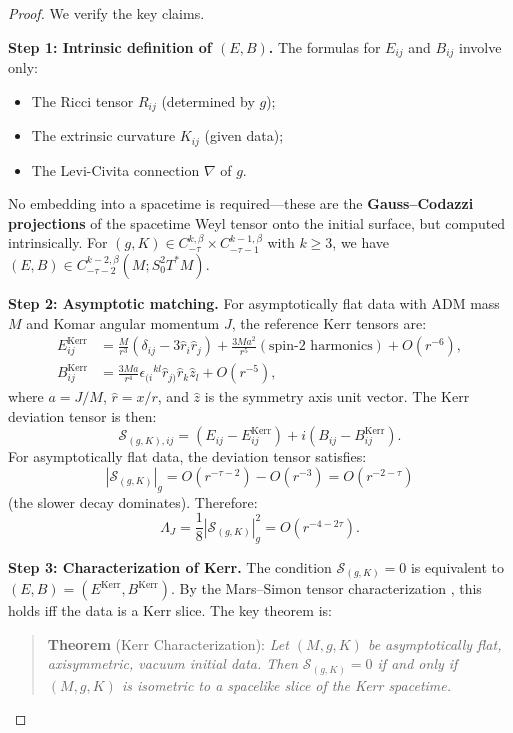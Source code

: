 \documentclass[12pt]{article}
\theoremstyle{plain}
\theoremstyle{definition}
\theoremstyle{remark}
\newcommand{\Hoelder}{\beta}
\begin{document}
\begin{proof}[Proof]
We verify the key claims.

\textbf{Step 1: Intrinsic definition of $(E, B)$.}
The formulas for $E_{ij}$ and $B_{ij}$ involve only:
\begin{itemize}
    \item The Ricci tensor $R_{ij}$ (determined by $g$);
    \item The extrinsic curvature $K_{ij}$ (given data);
    \item The Levi-Civita connection $\nabla$ of $g$.
\end{itemize}
No embedding into a spacetime is required---these are the \textbf{Gauss--Codazzi projections} of the spacetime Weyl tensor onto the initial surface, but computed intrinsically. For $(g, K) \in C^{k,\Hoelder}_{-\tau} \times C^{k-1,\Hoelder}_{-\tau-1}$ with $k \geq 3$, we have $(E, B) \in C^{k-2,\Hoelder}_{-\tau-2}(M; S^2_0 T^*M)$.

\textbf{Step 2: Asymptotic matching.} For asymptotically flat data with ADM mass $M$ and Komar angular momentum $J$, the reference Kerr tensors are:
\begin{align*}
E^{\mathrm{Kerr}}_{ij} &= \frac{M}{r^3}\left(\delta_{ij} - 3\hat{r}_i\hat{r}_j\right) + \frac{3Ma^2}{r^5}\left(\text{spin-2 harmonics}\right) + O(r^{-6}), \\
B^{\mathrm{Kerr}}_{ij} &= \frac{3Ma}{r^4}\epsilon_{(i}{}^{kl}\hat{r}_{j)}\hat{r}_k \hat{z}_l + O(r^{-5}),
\end{align*}
where $a = J/M$, $\hat{r} = x/r$, and $\hat{z}$ is the symmetry axis unit vector. The Kerr deviation tensor is then:
\[
\mathcal{S}_{(g,K),ij} = (E_{ij} - E^{\mathrm{Kerr}}_{ij}) + i(B_{ij} - B^{\mathrm{Kerr}}_{ij}).
\]
For asymptotically flat data, the deviation tensor satisfies:
\[
|\mathcal{S}_{(g,K)}|_g = O(r^{-\tau-2}) - O(r^{-3}) = O(r^{-2-\tau})
\]
(the slower decay dominates). Therefore:
\[
\Lambda_J = \frac{1}{8}|\mathcal{S}_{(g,K)}|^2_g = O(r^{-4-2\tau}).
\]

\textbf{Step 3: Characterization of Kerr.}
The condition $\mathcal{S}_{(g,K)} = 0$ is equivalent to $(E, B) = (E^{\mathrm{Kerr}}, B^{\mathrm{Kerr}})$. By the Mars--Simon tensor characterization \cite{mars1999, simon1984}, this holds iff the data is a Kerr slice. The key theorem is:

\begin{quote}
\textbf{Theorem} (Kerr Characterization): \textit{Let $(M, g, K)$ be asymptotically flat, axisymmetric, vacuum initial data. Then $\mathcal{S}_{(g,K)} = 0$ if and only if $(M, g, K)$ is isometric to a spacelike slice of the Kerr spacetime.}
\end{quote}


\end{proof}
\end{document}

